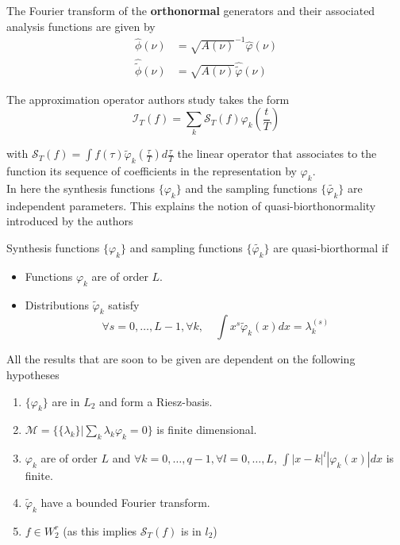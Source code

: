 \documentclass[a4paper, 11pt]{article}
\begin{document}
The Fourier transform of the \textbf{orthonormal} generators and their associated analysis functions are given by 
\begin{align}
  \hat{\phi}(\nu)  &= \sqrt{A(\nu)}^{-1} \hat{\varphi}(\nu) \\
  \hat{\tilde{\phi}}(\nu)  &= \sqrt{A(\nu)} \hat{\tilde{\varphi}}(\nu)
\end{align}

The approximation operator authors study takes the form
\begin{equation}
  \mathcal{I}_T(f) = \sum_{k} \mathcal{S}_T (f) \varphi_k(\frac{t}{T})
\end{equation}

with $\mathcal{S}_T (f) = \int f(\tau) \tilde{\varphi}_k(\frac{\tau}{T}) d\frac{\tau}{T}$ the linear operator that 
associates to the function its sequence of coefficients in the representation by $\varphi_k$. \\

In here the synthesis functions $\{\varphi_k\}$ and the sampling functions $\{\tilde{\varphi_k}\}$ are independent 
parameters.  This explains the notion of quasi-biorthonormality introduced by the authors

\begin{deftn}{1}
    Synthesis functions $\{\varphi_k\}$ and sampling functions $\{\tilde{\varphi_k}\}$ are quasi-biorthormal if
    \begin{itemize}
      \item Functions $\varphi_k$ are of order $L$.
      \item Distributions $\tilde{\varphi}_k$ satisfy
        \begin{equation*}
          \forall s=0,\dots, L-1, \forall k, \quad \int x^s \tilde{\varphi}_k(x)dx = \lambda_k^{(s)}
        \end{equation*}
    \end{itemize}
\end{deftn}

All the results that are soon to be given are dependent on the following hypotheses

\begin{enumerate}
  \item $\{\varphi_k\}$ are in $L_2$ and form a Riesz-basis.
  \item $\mathcal{M} = \{ \{\lambda_k\} | \sum_k \lambda_k \varphi_k = 0 \}$ is finite dimensional.
  \item $\varphi_k$ are of order $L$ and $\forall k=0, \dots, q-1, \forall l=0,\dots, L$, $\int |x-k|^l 
    |\varphi_k(x)|dx$ is finite.
  \item $\tilde{\varphi}_k$ have a bounded Fourier transform.
  \item $f \in W^r_2$ (as this implies $\mathcal{S}_T(f)$ is in $l_2$)
\end{enumerate}
\end{document}
